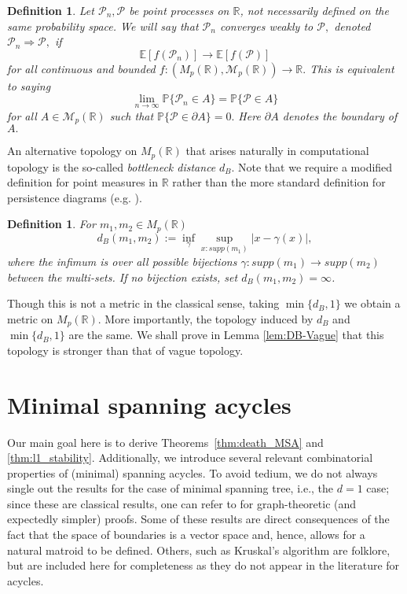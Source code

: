\documentclass[12pt]{amsart}
\renewcommand{\Pr}{\mathbb{P}}
\newcommand{\gt}[1]{\textcolor{blue}{#1}}
\renewcommand{\gt}[1]{#1}
\newtheorem{definition}[theorem]{Definition}
\numberwithin{equation}{section}
\numberwithin{theorem}{section}
\newcommand{\1}{\mathbf{1}}
\def\M{\mathcal{M}}
\def\sP{\mathscr{P}}
\def\bR{\mathbb{R}}
\begin{document}
%
\begin{definition}
Let $\sP_{n}, \sP$ be point processes on $\bR$, not necessarily defined on the same probability
space. We will say that $\sP_n$ converges weakly to $\sP,$ denoted $\sP_{n} \Rightarrow \sP,$ if
\[
\mathbb{E}[f(\sP_n)] \to \mathbb{E}[f(\sP)]
\]
for all continuous and bounded $f: (M_{p}(\bR), \M_p(\bR)) \to \bR.$ This is equivalent to saying
\[
\lim_{n \to \infty} \Pr\{\sP_{n} \in A\} = \Pr\{\sP \in A\}
\]
for all $A \in \M_{p}(\bR)$ such that $\Pr\{\sP \in \partial A\} = 0.$ Here $\partial A$ denotes the boundary of $A.$
\end{definition}

An alternative topology on $M_p(\bR)$ that arises naturally in computational topology is the so-called {\em bottleneck distance} $d_B.$ Note that we require a modified definition for point measures in $\bR$ rather than the more standard definition for persistence diagrams (e.g. \cite{chazal2009proximity,Edelsbrunner10}).

%
\begin{definition}
\label{def:db_point}
For $m_1,m_2 \in M_p(\bR)$
%
\[ d_B(m_1,m_2) := \inf_{\gamma} \sup_{x : supp(m_1)} |x - \gamma(x)|,\]
%
where the infimum is over all possible bijections $\gamma : supp(m_1) \to supp(m_2)$ between the multi-sets. If no bijection exists, set $d_B(m_1,m_2) = \infty$.
\end{definition}
%
Though this is not a metric in the classical sense, taking $\min\{d_B,1\}$ we obtain a metric on $M_p(\bR)$. More importantly, the topology induced by $d_B$ and $\min\{d_B,1\}$ are the same. We shall prove in Lemma \ref{lem:DB-Vague} that this topology is stronger than that of vague topology.

\section{Minimal spanning acycles}
\label{sec:MSA}
%
\gt{Our main goal here is to derive Theorems~\ref{thm:death_MSA} and \ref{thm:l1_stability}.} Additionally, we introduce several relevant combinatorial properties of (minimal) spanning acycles. To avoid tedium, we do not always single out the results for the case of minimal spanning tree, i.e., \gt{the $d = 1$ case}; since these are classical results, one can refer to \cite{Algorithms09, MSTWiki} for graph-theoretic (and expectedly simpler) proofs. Some of these results are direct consequences of the fact that the space of boundaries is a vector space \gt{and, hence, allows for a natural matroid to be defined}. Others, such as Kruskal's algorithm are folklore, but are included here for completeness as they do not appear in the literature for acycles.
\end{document}
